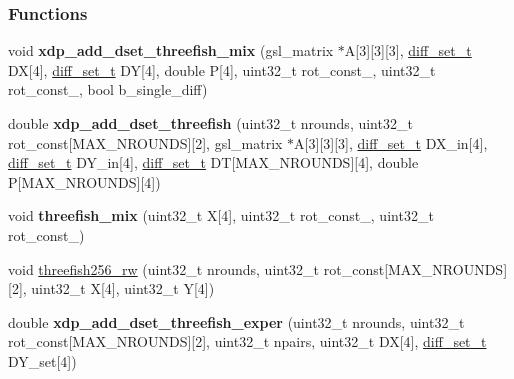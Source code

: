 \subsubsection*{\-Functions}
\begin{DoxyCompactItemize}
\item 
\hypertarget{threefish_8hh_a308792d94817f48bd070edc04d4b0a22}{void {\bfseries xdp\-\_\-add\-\_\-dset\-\_\-threefish\-\_\-mix} (gsl\-\_\-matrix $\ast$\-A\mbox{[}3\mbox{]}\mbox{[}3\mbox{]}\mbox{[}3\mbox{]}, \hyperlink{structdiff__set__t}{diff\-\_\-set\-\_\-t} \-D\-X\mbox{[}4\mbox{]}, \hyperlink{structdiff__set__t}{diff\-\_\-set\-\_\-t} \-D\-Y\mbox{[}4\mbox{]}, double \-P\mbox{[}4\mbox{]}, uint32\-\_\-t rot\-\_\-const\-\_, uint32\-\_\-t rot\-\_\-const\-\_, bool b\-\_\-single\-\_\-diff)}\label{threefish_8hh_a308792d94817f48bd070edc04d4b0a22}

\item 
\hypertarget{threefish_8hh_aa251a619dc380482c6edacf9068d3f9a}{double {\bfseries xdp\-\_\-add\-\_\-dset\-\_\-threefish} (uint32\-\_\-t nrounds, uint32\-\_\-t rot\-\_\-const\mbox{[}\-M\-A\-X\-\_\-\-N\-R\-O\-U\-N\-D\-S\mbox{]}\mbox{[}2\mbox{]}, gsl\-\_\-matrix $\ast$\-A\mbox{[}3\mbox{]}\mbox{[}3\mbox{]}\mbox{[}3\mbox{]}, \hyperlink{structdiff__set__t}{diff\-\_\-set\-\_\-t} \-D\-X\-\_\-in\mbox{[}4\mbox{]}, \hyperlink{structdiff__set__t}{diff\-\_\-set\-\_\-t} \-D\-Y\-\_\-in\mbox{[}4\mbox{]}, \hyperlink{structdiff__set__t}{diff\-\_\-set\-\_\-t} \-D\-T\mbox{[}\-M\-A\-X\-\_\-\-N\-R\-O\-U\-N\-D\-S\mbox{]}\mbox{[}4\mbox{]}, double \-P\mbox{[}\-M\-A\-X\-\_\-\-N\-R\-O\-U\-N\-D\-S\mbox{]}\mbox{[}4\mbox{]})}\label{threefish_8hh_aa251a619dc380482c6edacf9068d3f9a}

\item 
\hypertarget{threefish_8hh_a9054d2b44ee97d2e44d30edd533e590f}{void {\bfseries threefish\-\_\-mix} (uint32\-\_\-t \-X\mbox{[}4\mbox{]}, uint32\-\_\-t rot\-\_\-const\-\_, uint32\-\_\-t rot\-\_\-const\-\_)}\label{threefish_8hh_a9054d2b44ee97d2e44d30edd533e590f}

\item 
void \hyperlink{threefish_8hh_a736294f06bc8f47c81e115294c6ee0a9}{threefish256\-\_\-rw} (uint32\-\_\-t nrounds, uint32\-\_\-t rot\-\_\-const\mbox{[}\-M\-A\-X\-\_\-\-N\-R\-O\-U\-N\-D\-S\mbox{]}\mbox{[}2\mbox{]}, uint32\-\_\-t \-X\mbox{[}4\mbox{]}, uint32\-\_\-t \-Y\mbox{[}4\mbox{]})
\item 
\hypertarget{threefish_8hh_a937744c9e873a2d5d39b19a508030217}{double {\bfseries xdp\-\_\-add\-\_\-dset\-\_\-threefish\-\_\-exper} (uint32\-\_\-t nrounds, uint32\-\_\-t rot\-\_\-const\mbox{[}\-M\-A\-X\-\_\-\-N\-R\-O\-U\-N\-D\-S\mbox{]}\mbox{[}2\mbox{]}, uint32\-\_\-t npairs, uint32\-\_\-t \-D\-X\mbox{[}4\mbox{]}, \hyperlink{structdiff__set__t}{diff\-\_\-set\-\_\-t} \-D\-Y\-\_\-set\mbox{[}4\mbox{]})}\label{threefish_8hh_a937744c9e873a2d5d39b19a508030217}


\end{DoxyCompactItemize}
